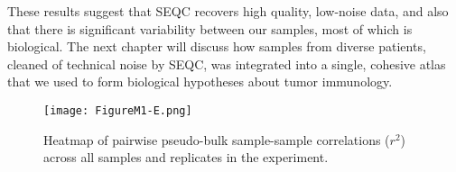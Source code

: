 These results suggest that SEQC recovers high quality, low-noise data, and also that there is significant variability between our samples, most of which is biological. 
The next chapter will discuss how samples from diverse patients, cleaned of technical noise by SEQC, was integrated into a single, cohesive atlas that we used to form biological hypotheses about tumor immunology. 

\begin{figure}
\centering
\texttt{[image: FigureM1-E.png]}
\caption{Heatmap of pairwise pseudo-bulk sample-sample correlations ($r^2$) across all samples
and replicates in the experiment.
}
\label{fig:m1e}
\end{figure}

